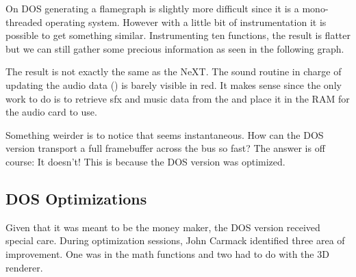 On DOS generating a flamegraph is slightly more difficult since it is a mono-threaded operating system. However with a little bit of instrumentation it is possible to get something similar. Instrumenting ten functions, the result is flatter but we can still gather some precious information as seen in the following graph.\\
\par
\vspace{4mm}
\par
The result is not exactly the same as the NeXT. The sound routine in charge of updating the audio data () is barely visible in red. It makes sense since the only work to do is to retrieve sfx and music data from the  and place it in the RAM for the audio card to use.\\
\par
 Something weirder is to notice that  seems instantaneous. How can the DOS version transport a full framebuffer across the bus so fast? The answer is off course: It doesn't! This is because the DOS version was optimized.\\
\par


\subsection{DOS Optimizations}
Given that it was meant to be the money maker, the DOS version received special care. During optimization sessions, John Carmack identified three area of improvement. One was in the math functions and two had to do with the 3D renderer.\\
 \par
\par





